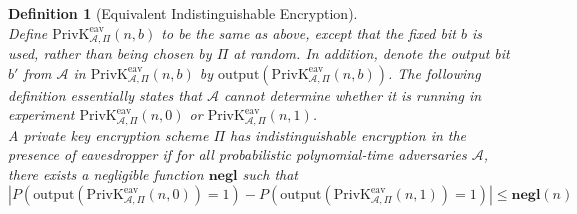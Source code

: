 \documentclass[12pt]{article}
\newcommand\PrivK{\mathrm{PrivK}}
\newtheorem{definition}{Definition}[section]
\theoremstyle{definition}
\begin{document}
\begin{definition}[Equivalent Indistinguishable Encryption]
\hfill\\\normalfont Define $\PrivK _{\mathcal{A},\Pi}^\text{eav}(n,b)$ to be the same as above, except that the fixed bit $b$ is used, rather than being chosen by $\Pi$ at random. In addition, denote the output bit $b'$ from $\mathcal{A}$ in $\PrivK _{\mathcal{A},\Pi}^\text{eav}(n,b)$ by $\text{output}(\PrivK _{\mathcal{A},\Pi}^\text{eav}(n,b))$. The following definition essentially states that $\mathcal{A}$ cannot determine whether it is running in experiment $\PrivK _{\mathcal{A},\Pi}^\text{eav}(n,0)$ or $\PrivK _{\mathcal{A},\Pi}^\text{eav}(n,1)$.\\

A private key encryption scheme $\Pi$ has indistinguishable encryption in the presence of eavesdropper if for all probabilistic polynomial-time adversaries $\mathcal{A}$, there exists a negligible function $\mathbf{negl}$ such that
$
|P(\text{output}(\PrivK _{\mathcal{A},\Pi}^\text{eav}(n,0))=1)-P(\text{output}(\PrivK _{\mathcal{A},\Pi}^\text{eav}(n,1))=1)|\leq \mathbf{negl}(n)
$
\end{definition}
\end{document}
